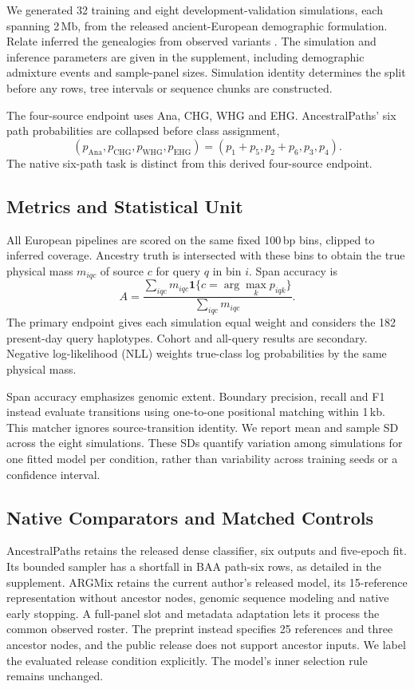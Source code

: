 \documentclass[letterpaper]{article}
\begin{document}
We generated 32 training and eight development-validation simulations, each spanning 2\,Mb, from the released ancient-European demographic formulation. Relate inferred the genealogies from observed variants \citep{relate2019}. The simulation and inference parameters are given in the supplement, including demographic admixture events and sample-panel sizes. Simulation identity determines the split before any rows, tree intervals or sequence chunks are constructed.

The four-source endpoint uses Ana, CHG, WHG and EHG. AncestralPaths' six path probabilities are collapsed before class assignment,
\begin{equation}
(p_{\mathrm{Ana}},p_{\mathrm{CHG}},p_{\mathrm{WHG}},p_{\mathrm{EHG}})
=(p_1+p_5,p_2+p_6,p_3,p_4).
\end{equation}
The native six-path task is distinct from this derived four-source endpoint.

\subsection{Metrics and Statistical Unit}
All European pipelines are scored on the same fixed 100\,bp bins, clipped to inferred coverage. Ancestry truth is intersected with these bins to obtain the true physical mass $m_{iqc}$ of source $c$ for query $q$ in bin $i$. Span accuracy is
\begin{equation}
A=\frac{\sum_{iqc}m_{iqc}
  \mathbf{1}\{c=\arg\max_k p_{iqk}\}}
 {\sum_{iqc}m_{iqc}}.
\end{equation}
The primary endpoint gives each simulation equal weight and considers the 182 present-day query haplotypes. Cohort and all-query results are secondary. Negative log-likelihood (NLL) weights true-class log probabilities by the same physical mass.

Span accuracy emphasizes genomic extent. Boundary precision, recall and F1 instead evaluate transitions using one-to-one positional matching within 1\,kb. This matcher ignores source-transition identity. We report mean and sample SD across the eight simulations. These SDs quantify variation among simulations for one fitted model per condition, rather than variability across training seeds or a confidence interval.

\subsection{Native Comparators and Matched Controls}
AncestralPaths retains the released dense classifier, six outputs and five-epoch fit. Its bounded sampler has a shortfall in BAA path-six rows, as detailed in the supplement. ARGMix retains the current author's released model, its 15-reference representation without ancestor nodes, genomic sequence modeling and native early stopping. A full-panel slot and metadata adaptation lets it process the common observed roster. The preprint instead specifies 25 references and three ancestor nodes, and the public release does not support ancestor inputs. We label the evaluated release condition explicitly. The model's inner selection rule remains unchanged.
\end{document}
